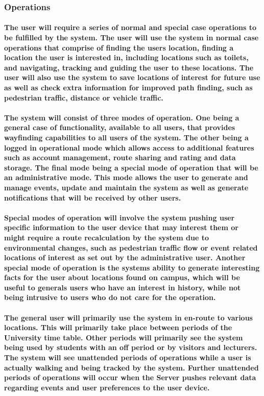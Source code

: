 \documentclass{article}
\begin{document}
            \subsubsection{Operations}
            	\paragraph{The user will require a series of normal and special case operations to be fulfilled by the system. The user will use the system in normal case operations that comprise of finding the users location, finding a location the user is interested in, including locations such as toilets, and navigating, tracking and guiding the user to these locations. The user will also use the system to save locations of interest for future use as well as check extra information for improved path finding, such as pedestrian traffic, distance or vehicle traffic.\\\\
            	The system will consist of three modes of operation. One  being a general case of functionality, available to all users, that provides wayfinding capabilities to all users of the system. The other being a logged in operational mode which allows access to additional features such as account management, route sharing and rating and data storage. The final mode being a special mode of operation that will be an administrative mode. This mode allows the user to generate and manage events, update and maintain the system as well as generate notifications that will be received by other users.\\\\
            	Special modes of operation will involve the system pushing user specific information to the user device that may interest them or might require a route recalculation by the system due to environmental changes, such as pedestrian traffic flow or event related locations of interest as set out by the administrative user. Another special mode of operation is the systems ability to generate interesting facts for the user about locations found on campus, which will be useful to generals users who have an interest in history, while not being intrusive to users who do not care for the operation.\\\\
            	The general user will primarily use the system in en-route to various locations. This will primarily take place between periods of the University time table. Other periods will primarily see the system being used by students with an off period or by visitors and lecturers. The system will see unattended periods of operations while a user is actually walking and being tracked by the system. Further unattended periods of operations will occur when the Server pushes relevant data regarding events and user preferences to the user device.\\\\
}
\end{document}
